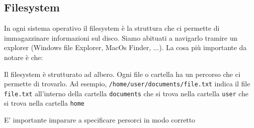 \subsection{Filesystem}
In ogni sistema operativo il filesystem è la struttura che ci permette di immagazzinare informazioni sul disco. Siamo abituati a navigarlo tramire un explorer (Windows file Explorer, MacOs Finder, ...). La cosa più importante da notare è che:
\begin{center}
	Il filesystem è strutturato ad albero. Ogni file o cartella ha un percorso che ci permette di trovarlo. Ad esempio, \verb|/home/user/documents/file.txt| indica il file \verb|file.txt| all'interno della cartella \verb|documents| che si trova nella cartella \verb|user| che si trova nella cartella \verb|home|
\end{center}
E' importante imparare a specificare persorci in modo corretto

